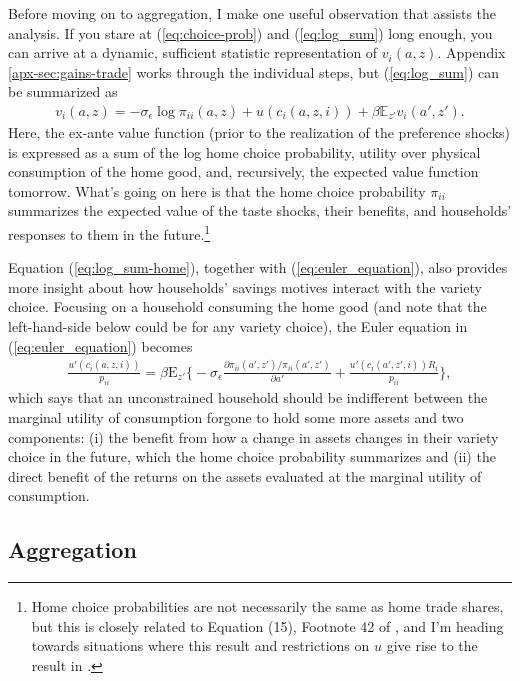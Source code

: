 \documentclass[12pt,pdftex]{article}
\begin{document}
\begin{onehalfspacing}
Before moving on to aggregation, I make one useful observation that assists the analysis. If you stare at (\ref{eq:choice-prob}) and (\ref{eq:log_sum}) long enough, you can arrive at a dynamic, sufficient statistic representation of $v_i(a, z)$. Appendix \ref{apx-sec:gains-trade} works through the individual steps, but (\ref{eq:log_sum}) can be summarized as
\begin{align}
v_i(a, z) = -\sigma_{\epsilon} \log \pi_{ii}(a,z) + u(c_{i}(a,z,i)) + \beta \mathbb{E}_{z'} v_{i}(a',z').
\label{eq:log_sum-home}
\end{align}
Here, the ex-ante value function (prior to the realization of the preference shocks) is expressed as a sum of the log home choice probability, utility over physical consumption of the home good, and, recursively, the expected value function tomorrow. What's going on here is that the home choice probability $\pi_{ii}$ summarizes the expected value of the taste shocks, their benefits, and households' responses to them in the future.\footnote{Home choice probabilities are not necessarily the same as home trade shares, but this is closely related to Equation (15), Footnote 42 of \citet{eaton2002technology}, and I'm heading towards situations where this result and restrictions on $u$ give rise to the result in \citet{arkolakis2012new}.} 


Equation (\ref{eq:log_sum-home}), together with (\ref{eq:euler_equation}), also provides more insight about how households' savings motives interact with the variety choice. Focusing on a household consuming the home good (and note that the left-hand-side below could be for any variety choice), the Euler equation in (\ref{eq:euler_equation}) becomes
\begin{align}
\frac{u'(c_{i}(a,z,i))}{p_{ii}} = \beta \mathrm{E}_{z'} \bigg \{ -\sigma_{\epsilon} \frac{\partial \pi_{ii}(a',z') / \pi_{ii}(a',z')}{\partial a'} + \frac{u'(c_{i}(a',z',i))R_i}{p_{ii}} \bigg \},
\label{eq:euler_equation-home}
\end{align}
which says that an unconstrained household should be indifferent between the marginal utility of consumption forgone to hold some more assets and two components: (i) the benefit from how a change in assets changes in their variety choice in the future, which the home choice probability summarizes and (ii) the direct benefit of the returns on the assets evaluated at the marginal utility of consumption.

\subsection{Aggregation}


\end{onehalfspacing}
\end{document}
